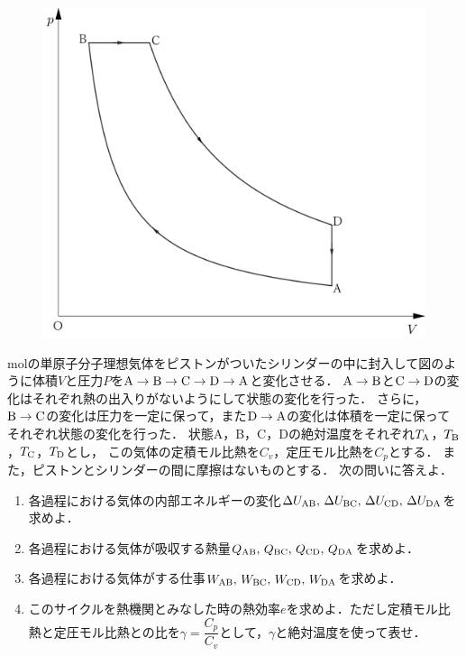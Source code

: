 \setcounter{figure}{0}
{
\begin{figure}
  \vspace{-\intextsep}
  \includegraphics[width=20zw]{../graphs/jumon_69.png}
  \caption{}
\end{figure}
\nn\unit{mol}の単原子分子理想気体をピストンがついたシリンダーの中に封入して図のように体積$V$と圧力$P$を$\textup{A}\to\textup{B}\to\textup{C}\to\textup{D}\to\textup{A}$と変化させる．
$\textup{A}\to\textup{B}$と$\textup{C}\to\textup{D}$の変化はそれぞれ熱の出入りがないようにして状態の変化を行った．
さらに，$\textup{B}\to\textup{C}$の変化は圧力を一定に保って，また$\textup{D}\to\textup{A}$の変化は体積を一定に保ってそれぞれ状態の変化を行った．
状態A，B，C，Dの絶対温度をそれぞれ$T_{\textup{A}}$，$T_{\textup{B}}$，$T_{\textup{C}}$，$T_{\textup{D}}$とし，
この気体の定積モル比熱を$C_v$，定圧モル比熱を$C_p$とする．
また，ピストンとシリンダーの間に摩擦はないものとする．
次の問いに答えよ．

\par}

\begin{enumerate}[（1）]
  \setlength{\leftskip}{-1.5zw}
  \setlength{\itemindent}{1zw}\setlength{\labelsep}{0.5zw}
  \setlength{\labelwidth}{1zw}\setlength{\leftmargin}{1zw}
  \setlength{\itemsep}{0.5\baselineskip}
  \item 各過程における気体の内部エネルギーの変化$\Delta U_{\textup{A}\textup{B}},\,\Delta U_{\textup{B}\textup{C}},\,\Delta U_{\textup{C}\textup{D}},\,\Delta U_{\textup{D}\textup{A}}$を求めよ．
  \item 各過程における気体が吸収する熱量$Q_{\textup{A}\textup{B}},\,Q_{\textup{B}\textup{C}},\,Q_{\textup{C}\textup{D}},\,Q_{\textup{D}\textup{A}}$を求めよ．
  \item 各過程における気体がする仕事$W_{\textup{A}\textup{B}},\,W_{\textup{B}\textup{C}},\,W_{\textup{C}\textup{D}},\,W_{\textup{D}\textup{A}}$を求めよ．
  \item このサイクルを熱機関とみなした時の熱効率$e$を求めよ．ただし定積モル比熱と定圧モル比熱との比を$\gamma =\dfrac{C_p}{C_v}$として，$\gamma$と絶対温度を使って表せ．
\end{enumerate}

